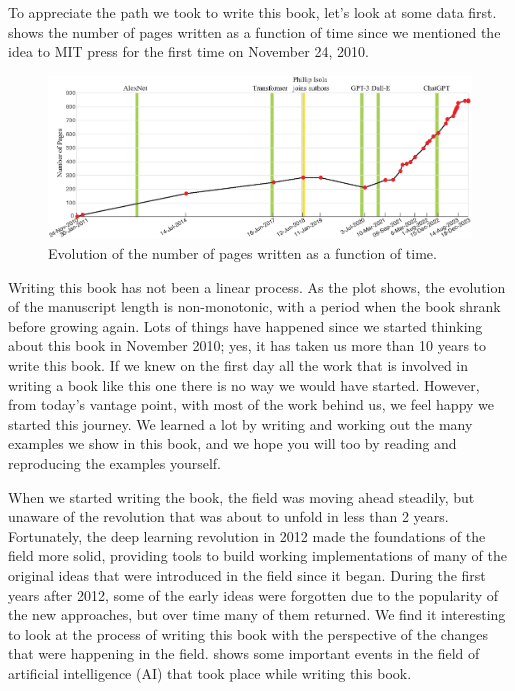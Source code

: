 To appreciate the path we took to write this book, let's look at some data first. \Fig{\ref{fig:evolution_pages}} shows the number of pages written as a function of time since we mentioned the idea to MIT press for the first time on November 24,  2010.


\begin{figure}
    \centerline{
        \includegraphics[width=1\linewidth]{figures/preface/book_evolution_final.eps}
    }
    \caption{Evolution of the number of pages written as a function of time.
    }
    \label{fig:evolution_pages}
\end{figure}


Writing this book has not been a linear process. As the plot shows, the evolution of the manuscript length is non-monotonic, with a period when the book shrank before growing again. Lots of things have happened since we started thinking about this book in November 2010; yes, it has taken us more than 10 years to write this book. If we knew on the first day all the work that is involved in writing a book like this one there is no way we would have started. However, from today's vantage point, with most of the work behind us, we feel happy we started this journey. We learned a lot by writing and working out the many examples we show in this book, and we hope you will too by reading and reproducing the examples yourself.

When we started writing the book, the field was moving ahead steadily, but unaware of the revolution that was about to unfold in less than 2 years. Fortunately, the deep learning revolution in 2012 made the foundations of the field more solid, providing tools to build working implementations of many of the original ideas that were introduced in the field since it began. During the first years after 2012, some of the early ideas were forgotten due to the popularity of the new approaches, but over time many of them returned. We find it interesting to look at the process of writing this book with the perspective of the changes that were happening in the field. \Fig{\ref{fig:evolution_pages}} shows some important events in the field of artificial intelligence (AI) that took place while writing this book.


